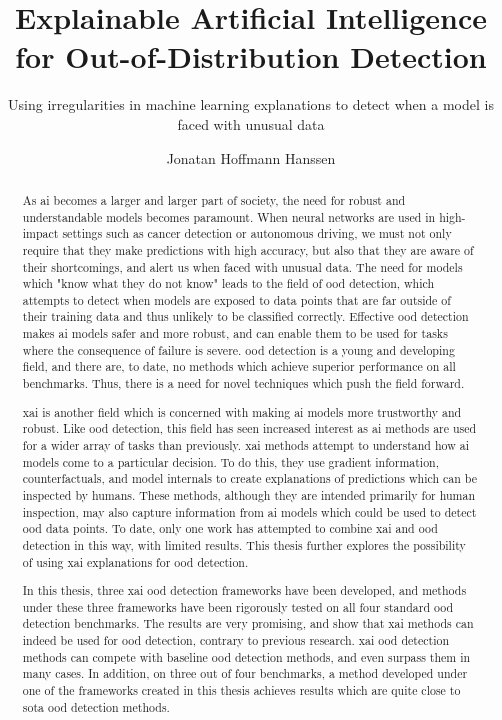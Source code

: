 \documentclass[UKenglish]{uiomasterthesis} %
\title{Explainable Artificial Intelligence for Out-of-Distribution Detection}
\subtitle{Using irregularities in machine learning explanations to detect when a model is faced with unusual data}
\author{Jonatan Hoffmann Hanssen}
\theoremstyle{definition}
\begin{document}
\uiomasterfp[dept={Department of Informatics},
program={Robotics and Intelligent Systems},
supervisors={Hugo Lewi Hammer \and Kyrre Harald Glette \and Michael Riegler}, long]

\frontmatter{}
\begin{abstract}
    As \ac{ai} becomes a larger and larger part of society, the need for robust and understandable models becomes paramount. When neural networks are used in high-impact settings such as cancer detection or autonomous driving, we must not only require that they make predictions with high accuracy, but also that they are aware of their shortcomings, and alert us when faced with unusual data. The need for models which "know what they do not know" leads to the field of \ac{ood} detection, which attempts to detect when models are exposed to data points that are far outside of their training data and thus unlikely to be classified correctly. Effective \ac{ood} detection makes \ac{ai} models safer and more robust, and can enable them to be used for tasks where the consequence of failure is severe. \ac{ood} detection is a young and developing field, and there are, to date, no methods which achieve superior performance on all benchmarks. Thus, there is a need for novel techniques which push the field forward.

    \ac{xai} is another field which is concerned with making \ac{ai} models more trustworthy and robust. Like \ac{ood} detection, this field has seen increased interest as \ac{ai} methods are used for a wider array of tasks than previously. \ac{xai} methods attempt to understand how \ac{ai} models come to a particular decision. To do this, they use gradient information, counterfactuals, and model internals to create explanations of predictions which can be inspected by humans. These methods, although they are intended primarily for human inspection, may also capture information from \ac{ai} models which could be used to detect \ac{ood} data points. To date, only one work has attempted to combine \ac{xai} and \ac{ood} detection in this way, with limited results. This thesis further explores the possibility of using \ac{xai} explanations for \ac{ood} detection.

    In this thesis, three \ac{xai} \ac{ood} detection frameworks have been developed, and methods under these three frameworks have been rigorously tested on all four standard \ac{ood} detection benchmarks. The results are very promising, and show that \ac{xai} methods can indeed be used for \ac{ood} detection, contrary to previous research. \ac{xai} \ac{ood} detection methods can compete with baseline \ac{ood} detection methods, and even surpass them in many cases. In addition, on three out of four benchmarks, a method developed under one of the frameworks created in this thesis achieves results which are quite close to \ac{sota} \ac{ood} detection methods.
\end{abstract}
\end{document}
